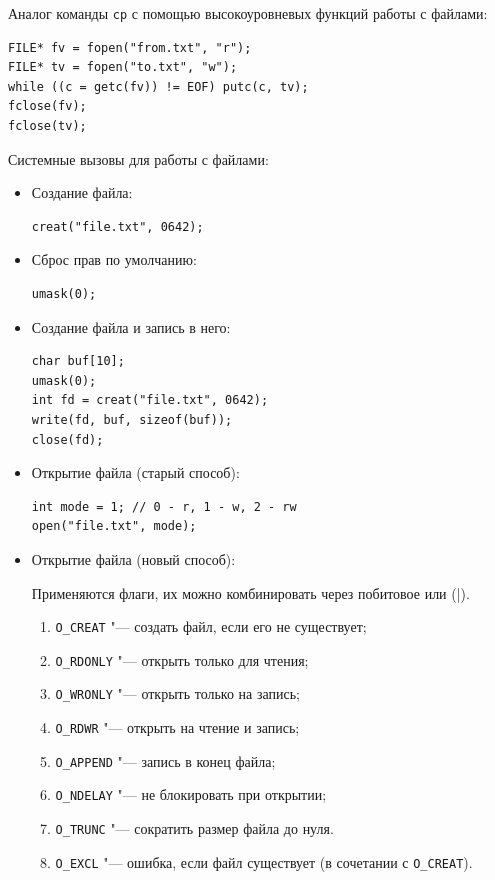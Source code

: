 Аналог команды \texttt{cp} с помощью высокоуровневых функций работы с файлами:

\begin{verbatim}
FILE* fv = fopen("from.txt", "r");
FILE* tv = fopen("to.txt", "w");
while ((c = getc(fv)) != EOF) putc(c, tv);
fclose(fv);
fclose(tv);
\end{verbatim}

Системные вызовы для работы с файлами:

\begin{itemize}
\item Создание файла:
\begin{verbatim}
creat("file.txt", 0642);
\end{verbatim}

\item Сброс прав по умолчанию:
\begin{verbatim}
umask(0);
\end{verbatim}

\item Создание файла и запись в него:
\begin{verbatim}
char buf[10];
umask(0);
int fd = creat("file.txt", 0642);
write(fd, buf, sizeof(buf));
close(fd);
\end{verbatim}

\item Открытие файла (старый способ):
\begin{verbatim}
int mode = 1; // 0 - r, 1 - w, 2 - rw
open("file.txt", mode);
\end{verbatim}

\item Открытие файла (новый способ):

Применяются флаги, их можно комбинировать через побитовое или (|).
\begin{enumerate}
    \item \texttt{O\_CREAT} "--- создать файл, если его не существует;
    \item \texttt{O\_RDONLY} "--- открыть только для чтения;
    \item \texttt{O\_WRONLY} "--- открыть только на запись;
    \item \texttt{O\_RDWR} "--- открыть на чтение и запись;
    \item \texttt{O\_APPEND} "--- запись в конец файла;
    \item \texttt{O\_NDELAY} "--- не блокировать при открытии;
    \item \texttt{O\_TRUNC} "--- сократить размер файла до нуля.
    \item \texttt{O\_EXCL} "--- ошибка, если файл существует (в сочетании с \texttt{O\_CREAT}).
\end{enumerate}


\end{itemize}
